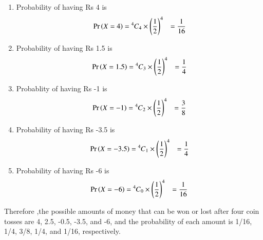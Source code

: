 \documentclass[journal,12pt,twocolumn]{IEEEtran}
\newcommand\Mycomb[2][^n]{\prescript{#1\mkern-0.5mu}{}C_{#2}}
\begin{document}
	

        
		\begin{enumerate}[label=(\roman*)]
	       \item	Probability of having Rs 4 is 
		       \begin{align}
			       \pr{X = 4} &= \Mycomb[4]{4} \times \left(\frac{1}{2}\right)^4  
			       &= \frac{1}{16} 
			\end{align}
		\item  Probability of having Rs 1.5 is
		       \begin{align}
			       \pr{X = 1.5} &=  \Mycomb[4]{3} \times \left(\frac{1}{2}\right)^4
			       &= \frac{1}{4} 
			\end{align}
		\item Probablity of having Rs -1 is  
			\begin{align}
				\pr{X = -1} &=  \Mycomb[4]{2} \times \left(\frac{1}{2}\right)^4
			       &= \frac{3}{8} 
			\end{align}
		\item Probability of having Rs -3.5 is
		       \begin{align}
			       \pr{X = -3.5} &=\Mycomb[4]{1} \times \left(\frac{1}{2}\right)^4 
			       &= \frac{1}{4} 
			\end{align}
		\item Probability of having Rs -6 is 
		       \begin{align}
			       \pr{X = -6} &=  \Mycomb[4]{0} \times \left(\frac{1}{2}\right)^4 
			       &= \frac{1}{16} 
			\end{align}
	\end{enumerate}
	Therefore ,the possible amounts of money that can be won or lost after four coin tosses are 4, 2.5, -0.5, -3.5, and -6, and the probability of each amount is 1/16, 1/4, 3/8, 1/4, and 1/16, respectively.
\end{document}
